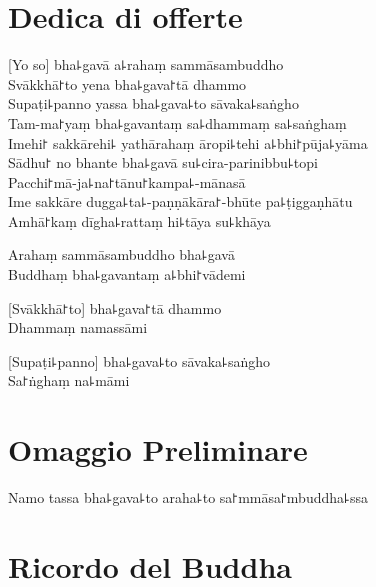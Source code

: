 
\chapter{Dedica di offerte}   %

[Yo so] bha꜕gavā a꜕rahaṃ sammāsambuddho\\
Svākkhā꜓to yena bha꜕gava꜓tā dhammo\\
Supaṭi꜕panno yassa bha꜕gava꜕to sāvaka꜕saṅgho\\
Tam-ma꜓yaṃ bha꜕gavantaṃ sa꜕dhammaṃ sa꜕saṅghaṃ\\
Imehi꜓ sakkārehi꜕ yathārahaṃ āropi꜕tehi a꜕bhi꜓pūja꜕yāma\\
Sādhu꜓ no bhante bha꜕gavā su꜕cira-parinibbu꜕topi\\
Pacchi꜓mā-ja꜕na꜓tānu꜓kampa꜕-mānasā\\
Ime sakkāre dugga꜕ta꜕-paṇṇākāra꜓-bhūte pa꜕ṭiggaṇhātu\\
Amhā꜓kaṃ dīgha꜕rattaṃ hi꜕tāya su꜕khāya

Arahaṃ sammāsambuddho bha꜕gavā\\
Buddhaṃ bha꜕gavantaṃ a꜕bhi꜓vādemi 

[Svākkhā꜓to] bha꜕gava꜓tā dhammo\\
Dhammaṃ namassāmi 

[Supaṭi꜕panno] bha꜕gava꜕to sāvaka꜕saṅgho\\
Sa꜓ṅghaṃ na꜕māmi 

\chapter{Omaggio Preliminare}

\begin{leader}
\end{leader}

Namo tassa bha꜕gava꜕to araha꜕to sa꜓mmāsa꜓mbuddha꜕ssa


\clearpage

\chapter{Ricordo del Buddha}     %

\begin{leader}
\end{leader}

